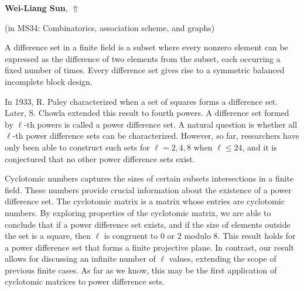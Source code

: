 \documentclass[ILAS2025-program.tex]{subfiles}
\begin{document}
\hypertarget{down0326}{}\begin{ilasabstract}
    
\textbf{Wei-Liang Sun},  \hfill \hyperlink{up0326}{$\Uparrow$}
    
    
(in {\color{mstitle}MS34: Combinatorics, association scheme, and graphs})
        
\mtskip
    A difference set in a finite field is a subset where every nonzero element can be expressed as the difference of two elements from the subset, each occurring a fixed number of times. Every difference set gives rise to a symmetric balanced incomplete block design.

In 1933, R. Paley characterized when a set of squares forms a difference set. Later, S. Chowla extended this result to fourth powers. A difference set formed by $\ell$-th powers is called a power difference set. A natural question is whether all $\ell$-th power difference sets can be characterized. However, so far, researchers have only been able to construct such sets for $\ell = 2, 4, 8$ when $\ell \leq 24$, and it is conjectured that no other power difference sets exist.

Cyclotomic numbers captures the sizes of certain subsets intersections in a finite field. These numbers provide crucial information about the existence of a power difference set. The cyclotomic matrix is a matrix whose entries are cyclotomic numbers. By exploring properties of the cyclotomic matrix, we are able to conclude that if a power difference set exists, and if the size of elements outside the set is a square, then $\ell$ is congruent to $0$ or $2$ modulo $8$. This result holds for a power difference set that forms a finite projective plane. In contrast, our result allows for discussing an infinite number of $\ell$ values, extending the scope of previous finite cases. As far as we know, this may be the first application of cyclotomic matrices to power difference sets.

\end{ilasabstract}
    
\end{document}

